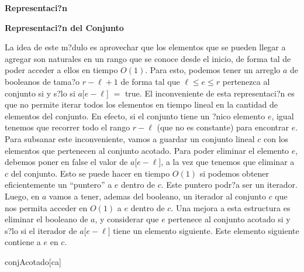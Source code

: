 \documentclass[a4paper,10pt]{article}
\newenvironment{Representacion}{%
  \vspace*{2ex}%
  \noindent\textbf{\Large Representaci?n}%
  \vspace*{2ex}%
}{}
\newcommand{\Titulo}[1]{
  \vspace*{1ex}\par\noindent\textbf{\large #1}\par
}
\begin{document}
\begin{Representacion}

  \Titulo{Representaci?n del Conjunto}
  
  La idea de este m?dulo es aprovechar que los elementos que se pueden llegar a agregar son naturales en un rango que se conoce desde el inicio, de forma tal de poder acceder a ellos en tiempo $O(1)$.  Para esto, podemos tener un arreglo $a$ de booleanos de tama?o $r - \ell + 1$ de forma tal que $\ell \leq e \leq r$ pertenezca al conjunto si y s?lo si $a$[$e-\ell$] $=$ true.  El inconveniente de esta representaci?n es que no permite iterar todos los elementos en tiempo lineal en la cantidad de elementos del conjunto.  En efecto, si el conjunto tiene un ?nico elemento $e$, igual tenemos que recorrer todo el rango $r - \ell$ (que no es constante) para encontrar $e$.  Para subsanar este inconveniente, vamos a guardar un conjunto lineal $c$ con los elementos que pertenecen al conjunto acotado.  Para poder eliminar el elemento $e$, debemos poner en false el valor de $a$[$e-\ell$], a la vez que tenemos que eliminar a $c$ del conjunto.  Esto se puede hacer en tiempo $O(1)$ si podemos obtener eficientemente un ``puntero'' a $e$ dentro de $c$.  Este puntero podr?a ser un iterador.  Luego, en $a$ vamos a tener, ademas del booleano, un iterador al conjunto $c$ que nos permita acceder en $O(1)$ a $e$ dentro de $c$.  Una mejora a esta estructura es eliminar el booleano de $a$, y considerar que $e$ pertenece al conjunto acotado si y s?lo si el iterador de $a$[$e - \ell$] tiene un elemento siguiente.  Este elemento siguiente contiene a $e$ en $c$.

  \begin{Estructura}{conjAcotado}[ca]
    \begin{Tupla}[ca]%
    \end{Tupla}
  \end{Estructura}

  \mbox{}


\end{Representacion}
\end{document}
